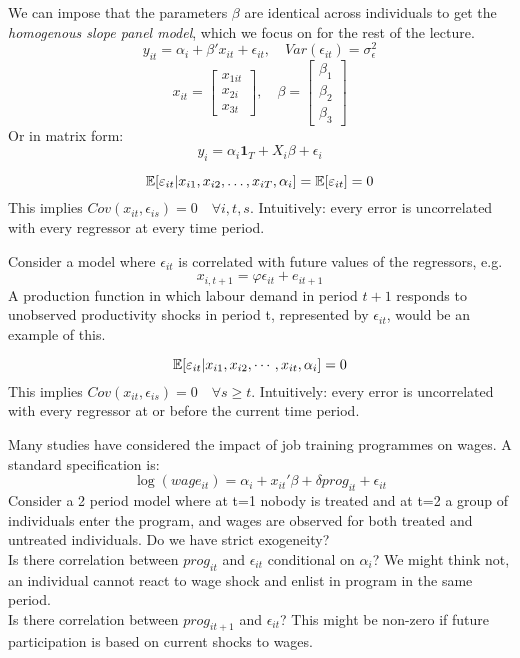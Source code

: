 \documentclass[DIV=14,titlepage=false]{scrreprt}
\begin{document}
We can impose that the parameters $\beta$ are identical across individuals to get the \textit{homogenous slope panel model}, which we focus on for the rest of the lecture.
\[
    y_{it} = \alpha_i + \beta'x_{it} + \epsilon_{it}, \quad Var(\epsilon_{it}) = \sigma^2_{\epsilon}
\]
\[
    x_{it} = \begin{bmatrix} x_{1it} \\ x_{2i} \\ x_{3t} \end{bmatrix}, \quad \beta = \begin{bmatrix} \beta_1 \\ \beta_2 \\ \beta_3 \end{bmatrix}
\]
Or in matrix form:
\[
    y_i = \alpha_i\mathbf{1}_T + X_i\beta + \epsilon_i
\]
\begin{definition}
    \[
        \mathbb{E}[\varepsilon_{it}|x_{i1},x_{i2},\dots, x_{iT}, \alpha_i] = \mathbb{E}[\varepsilon_{it}] = 0 
    \]
    This implies $Cov(x_{it}, \epsilon_{is}) = 0 \quad \forall i, t, s$. Intuitively: every error is uncorrelated with every regressor at every time period.
\end{definition}
\begin{example}
    Consider a model where $\epsilon_{it}$ is correlated with future values of the regressors, e.g.
    \[
        x_{i,t+1} = \varphi \epsilon_{it} + e_{it+1}
    \]
    A production function in which labour demand in period $t+1$ responds to unobserved productivity shocks in period t, represented by $\epsilon_{it}$, would be an example of this.
\end{example}
\begin{definition}
    \[
        \mathbb{E}[\varepsilon_{it}|x_{i1},x_{i2},\cdots, x_{it}, \alpha_i] = 0
    \]
    This implies $Cov(x_{it}, \epsilon_{is}) = 0 \quad \forall s \geq t$.
    Intuitively: every error is uncorrelated with every regressor at or before the current time period.
\end{definition}
\begin{example}
    Many studies have considered the impact of job training programmes on wages. A standard specification is:
    \[
        \log(wage_{it}) = \alpha_i + x_{it}'\beta + \delta prog_{it} + \epsilon_{it}
    \]
    Consider a 2 period model where at t=1 nobody is treated and at t=2 a group of individuals enter the program, and wages are observed for both treated and untreated individuals. Do we have strict exogeneity?\\
    Is there correlation between $prog_{it}$ and $\epsilon_{it} $ conditional on $\alpha_i$? We might think not, an individual cannot react to wage shock and enlist in program in the same period.\\
    Is there correlation between $prog_{it+1}$ and $\epsilon_{it}$? This might be non-zero if future participation is based on current shocks to wages.
\end{example}
\end{document}
